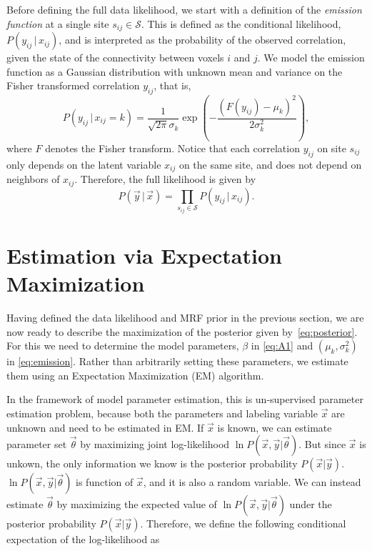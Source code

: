 \documentclass[12pt]{article}
\begin{document}
Before defining the full data likelihood, we start with a definition
of the {\em emission function} at a single site $s_{ij} \in
\mathcal{S}$. This is defined as the conditional likelihood,
$P(y_{ij} \, | \, x_{ij})$, and is interpreted as the probability of
the observed correlation, given the state of the connectivity
between voxels $i$ and $j$. We model the emission function as a
Gaussian distribution with unknown mean and variance on the Fisher
transformed correlation $y_{ij}$, that is,
\begin{equation}
  \label{eq:emission}
  P(y_{ij} \,|\, x_{ij} = k) = \frac{1}{\sqrt{2\pi} \sigma_k} \exp \left( -\frac{(F(y_{ij}) -  \mu_k)^2}{2\sigma_k^2}\right),
\end{equation}
where $F$ denotes the Fisher transform. Notice that each correlation $y_{ij}$ on
site $s_{ij}$ only depends on the latent variable $x_{ij}$ on the same site, and
does not depend on neighbors of $x_{ij}$. Therefore, the full likelihood is
given by
\begin{equation}
  \label{eq:likelihood}
  P(\vec y \, | \, \vec x) = \prod_{s_{ij}\in\mathcal{S}} P(y_{ij} \, | \, x_{ij}).
\end{equation}

\section{Estimation via Expectation Maximization}
\label{sec:algorithm}
Having defined the data likelihood and MRF prior in the previous
section, we are now ready to describe the maximization of the
posterior given by~\eqref{eq:posterior}. For this we need to
determine the model parameters, $\beta$ in \eqref{eq:A1} and
$(\mu_k, \sigma_k^2)$ in \eqref{eq:emission}. Rather than
arbitrarily setting these parameters, we estimate them using an
Expectation Maximization (EM) algorithm.

In the framework of model parameter estimation, this is un-supervised
parameter estimation problem, because both the parameters and labeling
variable $\vec x$ are unknown and need to be estimated in EM. If $\vec
x$ is known, we can estimate parameter set $\vec \theta$ by maximizing
joint log-likelihood $\ln P(\vec x, \vec y |\vec \theta)$. But since
$\vec x$ is unkown, the only information we know is the posterior
probability $P(\vec x| \vec y)$. $\ln P(\vec x, \vec y | \vec \theta)$
is function of $\vec x$, and it is also a random variable. We can
instead estimate $\vec \theta$ by maximizing the expected value of
$\ln P(\vec x, \vec y |\vec \theta)$ under the posterior probability
$P(\vec x| \vec y)$. Therefore, we define the following conditional
expectation of the log-likelihood as
\end{document}
